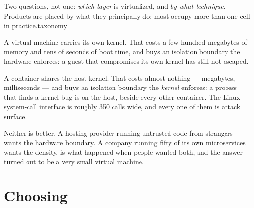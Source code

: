 {}%
{Two questions, not one: \emph{which layer} is virtualized, and \emph{by what
technique}. Products are placed by what they principally do; most occupy
more than one cell in practice.}{taxonomy}

\begin{conceptbox}
A virtual machine carries its own kernel. That costs a few hundred megabytes of
memory and tens of seconds of boot time, and buys an isolation boundary the
hardware enforces: a guest that compromises its own kernel has still not
escaped.

\smallskip
A container shares the host kernel. That costs almost nothing --- megabytes,
milliseconds --- and buys an isolation boundary the \emph{kernel} enforces: a
process that finds a kernel bug is on the host, beside every other container.
The Linux system-call interface is roughly 350 calls wide, and every one of
them is attack surface.

\smallskip
Neither is better. A hosting provider running untrusted code from strangers
wants the hardware boundary. A company running fifty of its own microservices
wants the density.  is what happened when people wanted both,
and the answer turned out to be a very small virtual machine.
\end{conceptbox}

\section{Choosing}

